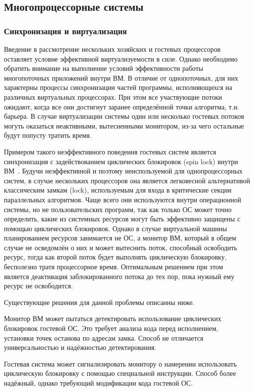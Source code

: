 \subsection{Многопроцессорные системы}

\subsubsection{Синхронизация и виртуализация}

Введение в рассмотрение нескольких хозяйских и гостевых процессоров оставляет условие эффективной виртуализуемости в силе. Однако необходимо обратить внимание на выполнение условий эффективности работы многопоточных приложений внутри ВМ. В отличие от однопоточных, для них характерны процессы синхронизации частей программы, исполняющихся на различных виртуальных процессорах. При этом все участвующие потоки ожидают, когда все они достигнут заранее определённой точки алгоритма, т.н. барьера. В случае виртуализации системы один или несколько гостевых потоков могуть оказаться неактивными, вытесненными монитором, из-за чего остальные будут попусту тратить время.

Примером такого неэффективного поведения гостевых систем является синхронизация с задействованием циклических блокировок (\abbr spin lock) внутри ВМ~\cite{southern-v12n}. Будучи неэффективной и поэтому неиспользуемой для однопроцессорных систем, в случае нескольких процессоров она является легковесной альтернативой классическим замкам (\abbr lock), используемым для входа в критические секции параллельных алгоритмов. Чаще всего они используются внутри операционной системы, но не пользовательских программ, так как только ОС может точно определить, какие из системных ресурсов могут быть эффективно защищены с помощью циклических блокировок. Однако в случае виртуальной машины планированием ресурсов занимается не ОС, а монитор ВМ, который в общем случае не осведомлён о них и может вытеснить поток, способный освободить ресурс, тогда как второй поток будет выполнять циклическую блокировку, бесполезно тратя процессорное время. Оптимальным решением при этом является деактивация заблокированного потока до тех пор, пока нужный ему ресурс не освободится.

Существующие решения для данной проблемы описанны ниже.

\begin{enumerate*}
    \item Монитор ВМ может пытаться детектировать использование циклических блокировок гостевой ОС. Это требует анализа кода перед исполнением, установки точек останова по адресам замка. Способ не отличается универсальностью и надёжностью детектирования.
    \item Гостевая система может сигнализировать монитору о намерении использовать циклическую блокировку с помощью специальной инструкции. Способ более надёжный, однако требующий модификации кода гостевой ОС.
\end{enumerate*}

